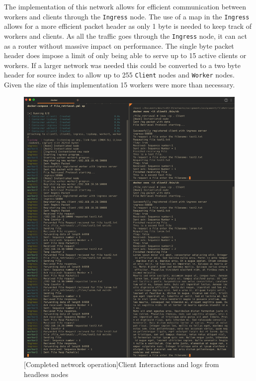 \documentclass{article}
\newcommand{\code}[1]{\texttt{#1}}
\begin{document}
The implementation of this network allows for efficient communication between workers and clients through the \code{Ingress} node. The use of a map in the \code{Ingress} allows for a more efficient packet header as only 1 byte is needed to keep track of workers and clients. As all the traffic goes through the \code{Ingress} node, it can act as a router without massive impact on performance. The single byte packet header does impose a limit of only being able to serve up to 15 active clients or workers. If a larger network was needed this could be converted to a two byte header for source index to allow up to 255 \code{Client} nodes and \code{Worker} nodes. Given the size of this implementation 15 workers were more than necessary.

\begin{figure}[!ht]
	\centering
	\begin{minipage}{.5\textwidth}
		\centering
		\includegraphics[width=0.8\linewidth]{operation_example.png}
		\captionsetup{width=.75\linewidth}
		[Completed network operation]{Client Interactions and logs from headless nodes}
		\label{fig:operation_example}
	\end{minipage}%
	\begin{minipage}{.5\textwidth}
		\centering

\end{minipage}
\end{figure}
\end{document}
